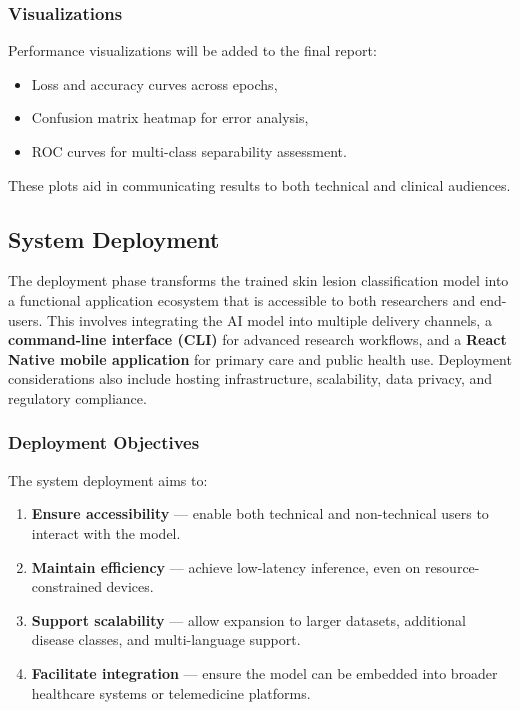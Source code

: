 \documentclass[
  12pt,
  oneside]{article}
\providecommand{\tightlist}{%
  \setlength{\itemsep}{0pt}\setlength{\parskip}{0pt}}
\begin{document}
\subsubsection{Visualizations}\label{visualizations}

Performance visualizations will be added to the final report:

\begin{itemize}
\tightlist
\item
  Loss and accuracy curves across epochs,
\item
  Confusion matrix heatmap for error analysis,
\item
  ROC curves for multi-class separability assessment.
\end{itemize}

These plots aid in communicating results to both technical and clinical
audiences.

\subsection{System Deployment}\label{system-deployment}

The deployment phase transforms the trained skin lesion classification
model into a functional application ecosystem that is accessible to both
researchers and end-users. This involves integrating the AI model into
multiple delivery channels, a \textbf{command-line interface (CLI)} for
advanced research workflows, and a \textbf{React Native mobile
application} for primary care and public health use. Deployment
considerations also include hosting infrastructure, scalability, data
privacy, and regulatory compliance.

\subsubsection{Deployment Objectives}\label{deployment-objectives}

The system deployment aims to:

\begin{enumerate}
\def\labelenumi{\arabic{enumi}.}
\tightlist
\item
  \textbf{Ensure accessibility} --- enable both technical and
  non-technical users to interact with the model.
\item
  \textbf{Maintain efficiency} --- achieve low-latency inference, even
  on resource-constrained devices.
\item
  \textbf{Support scalability} --- allow expansion to larger datasets,
  additional disease classes, and multi-language support.
\item
  \textbf{Facilitate integration} --- ensure the model can be embedded
  into broader healthcare systems or telemedicine platforms.
\end{enumerate}
\end{document}

